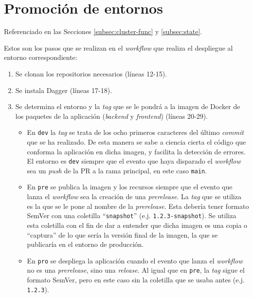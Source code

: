 \section{Promoción de entornos}
\label{sec:promotion}

Referenciado en las Secciones \ref{subsec:cluster-func} y \ref{subsec:state}.

Estos son los pasos que se realizan en el \textit{workflow} que realiza el despliegue al entorno correspondiente:

\begin{enumerate}
  \item Se clonan los repositorios necesarios (líneas 12-15).
  \item Se instala Dagger (líneas 17-18).
  \item Se determina el entorno y la \textit{tag} que se le pondrá a la imagen de Docker de los paquetes de la aplicación (\textit{backend} y \textit{frontend}) (líneas 20-29).
    \begin{itemize}
      \item En \texttt{dev} la \textit{tag} se trata de los ocho primeros caracteres del último \textit{commit} que se ha realizado. De esta manera se sabe a ciencia cierta el código que conforma la aplicación en dicha imagen, y facilita la detección de errores. El entorno es \texttt{dev} siempre que el evento que haya disparado el \textit{workflow} sea un \textit{push} de la PR a la rama principal, en este caso \texttt{main}.
      \item En \texttt{pre} se publica la imagen y los recursos siempre que el evento que lanza el \textit{workflow} sea la creación de una \textit{prerelease}. La \textit{tag} que se utiliza es la que se le pone al nombre de la \textit{prerelease}. Esta debería tener formato SemVer\cite{semver} con una coletilla ``\texttt{snapshot}'' (e.j. \texttt{1.2.3-snapshot}). Se utiliza esta coletilla con el fin de dar a entender que dicha imagen es una copia o ``captura'' de lo que sería la versión final de la imagen, la que se publicaría en el entorno de producción.
      \item En \texttt{pro} se despliega la aplicación cuando el evento que lanza el \textit{workflow} no es una \textit{prerelease}, sino una \textit{release}. Al igual que en \texttt{pre}, la \textit{tag} sigue el formato SemVer, pero en este caso sin la coletilla que se usaba antes (e.j. \texttt{1.2.3}).
    \end{itemize}
     

\end{enumerate}
